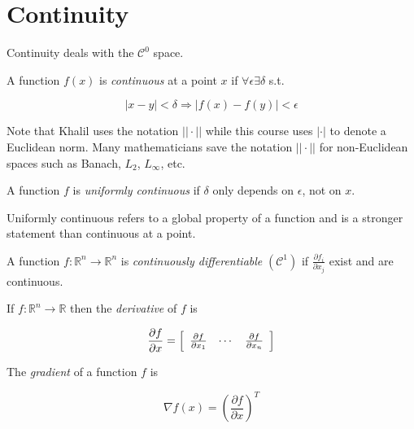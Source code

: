 \section{Continuity}
Continuity deals with the $\mathcal{C}^0$ space.

\begin{definition}
A function $f(x)$ is \textit{continuous} at a point $x$ if $\forall \epsilon \exists \delta$ s.t.

\begin{equation*}
|x-y|<\delta \Rightarrow |f(x)-f(y)|<\epsilon
\end{equation*}

\end{definition}
Note that Khalil uses the notation $||\cdot||$ while this course uses $|\cdot|$ to denote a Euclidean norm.
Many mathematicians save the notation $||\cdot||$ for non-Euclidean spaces such as Banach, $L_2$, $L_\infty$, etc.

\begin{definition}
A function $f$ is \textit{uniformly continuous} if $\delta$ only depends on $\epsilon$, not on $x$.
\end{definition}
Uniformly continuous refers to a global property of a function and is a stronger statement than continuous at a point.

\begin{definition}
A function $f:\mathbb{R}^n\to\mathbb{R}^n$ is \textit{continuously differentiable} $(\mathcal{C}^1)$ if $\frac{\partial f_i}{\partial x_j}$ exist and are continuous.
\end{definition}

\begin{definition}
If $f:\mathbb{R}^n\to\mathbb{R}$ then the \textit{derivative} of $f$ is

\begin{equation*}
\frac{\partial f}{\partial x} = \left[\begin{array}{c c c} \frac{\partial f}{\partial x_1} & \cdots & \frac{\partial f}{\partial x_n} \end{array}\right]
\end{equation*}

\end{definition}

\begin{definition}
The \textit{gradient} of a function $f$ is

\begin{equation*}
\nabla{} f (x) = \left(\frac{\partial{} f}{\partial{} x}\right)^T%
\end{equation*}

\end{definition}

